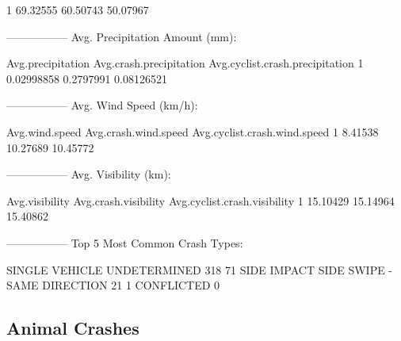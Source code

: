 \documentclass[11pt, a4paper]{article}
\begin{document}
\begin{Schunk}
\begin{Soutput}
1     69.32555           60.50743                   50.07967
\end{Soutput}
\begin{Soutput}
-----------------
Avg. Precipitation Amount (mm):
\end{Soutput}
\begin{Soutput}
  Avg.precipitation Avg.crash.precipitation Avg.cyclist.crash.precipitation
1        0.02998858               0.2797991                      0.08126521
\end{Soutput}
\begin{Soutput}
-----------------
Avg. Wind Speed (km/h):
\end{Soutput}
\begin{Soutput}
  Avg.wind.speed Avg.crash.wind.speed Avg.cyclist.crash.wind.speed
1        8.41538             10.27689                     10.45772
\end{Soutput}
\begin{Soutput}
-----------------
Avg. Visibility (km):
\end{Soutput}
\begin{Soutput}
  Avg.visibility Avg.crash.visibility Avg.cyclist.crash.visibility
1       15.10429             15.14964                     15.40862
\end{Soutput}
\begin{Soutput}
-----------------
Top 5 Most Common Crash Types:
\end{Soutput}
\begin{Soutput}
             SINGLE VEHICLE                UNDETERMINED 
                        318                          71 
                SIDE IMPACT SIDE SWIPE - SAME DIRECTION 
                         21                           1 
                 CONFLICTED 
                          0 
\end{Soutput}
\end{Schunk}






\pagebreak
\subsection{Animal Crashes}
\end{document}
